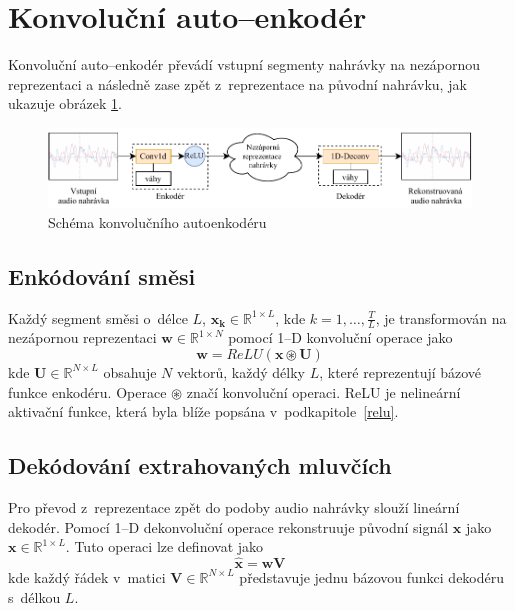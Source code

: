 \section{Konvoluční auto--enkodér}
Konvoluční auto--enkodér převádí vstupní segmenty nahrávky na nezápornou reprezentaci a následně zase zpět z~reprezentace na původní nahrávku, jak ukazuje obrázek \ref{fig:tasnet-autoenkoder}.
\begin{figure}[H]
    \centering
    \includegraphics[scale=0.9]{obrazky-figures/autoenkoder.pdf}
    \caption{\label{fig:tasnet-autoenkoder}Schéma konvolučního autoenkodéru}
\end{figure}


\subsection{Enkódování směsi}
Každý segment směsi o~délce $L$, $\boldsymbol{x_k} \in \mathbb{R}^{1 \times L}$, kde $k = 1, \dots, \frac{T}{L}$, je transformován na nezápornou reprezentaci $\boldsymbol{w} \in \mathbb{R}^{1 \times N}$ pomocí 1--D konvoluční operace jako
\begin{equation}
  	\boldsymbol{w} = ReLU(\boldsymbol{x} \circledast \boldsymbol{U})
\end{equation}
kde $\boldsymbol{U} \in \mathbb{R}^{N \times L}$ obsahuje $N$ vektorů, každý délky $L$, které reprezentují bázové funkce enkodéru. Operace $\circledast$ značí konvoluční operaci. ReLU je nelineární aktivační funkce, která byla blíže popsána v~podkapitole~\ref{relu}.


\subsection{Dekódování extrahovaných mluvčích}
Pro převod z~reprezentace zpět do podoby audio nahrávky slouží lineární dekodér. Pomocí 1--D dekonvoluční operace rekonstruuje původní signál $\boldsymbol{x}$ jako $\boldsymbol{x} \in \mathbb{R}^{1 \times L}$. Tuto operaci lze definovat jako 
\begin{equation}
\label{equ:decoder}
  \boldsymbol{\hat{x}} = \boldsymbol{w}\boldsymbol{V}
\end{equation}
kde každý řádek v~matici $\boldsymbol{V} \in \mathbb{R}^{N \times L}$ představuje jednu bázovou funkci dekodéru s~délkou $L$.

